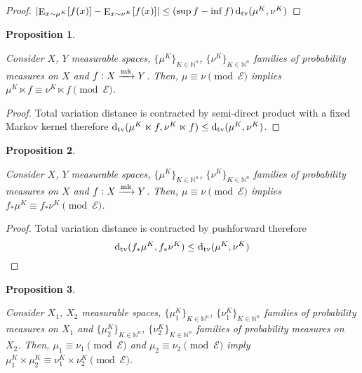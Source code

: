 \documentclass{article}
\numberwithin{equation}{section}
\theoremstyle{definition}
\theoremstyle{plain}
\newtheorem{proposition}{Proposition}[section]
\DeclareMathOperator{\E}{E}
\newcommand{\Dtv}{\operatorname{d}_{\textnormal{tv}}}
\newcommand{\Nats}{\mathbb{N}}
\newcommand{\Abs}[1]{\lvert #1 \rvert}
\newcommand{\Fall}{\mathcal{E}}
\newcommand{\Markov}{\xrightarrow{\textnormal{mk}}}
\begin{document}
\begin{proof}

$\Abs{\E_{x \sim \mu^K}[f(x)] - \E_{x \sim \nu^K}[f(x)]} \leq  (\sup f - \inf f)\Dtv(\mu^K, \nu^K)$
\end{proof}

\begin{samepage}
\begin{proposition}
\label{prp:prob_cong_semidir}

Consider $X$, $Y$ measurable spaces, $\{\mu^K\}_{K \in \Nats^n}$, $\{\nu^K\}_{K \in \Nats^n}$ families of probability measures on $X$ and $f: X \Markov Y$. Then, $\mu \equiv \nu \pmod \Fall$ implies $\mu^K \ltimes f \equiv \nu^K \ltimes f \pmod \Fall$.

\end{proposition}
\end{samepage}

\begin{proof}

Total variation distance is contracted by semi-direct product with a fixed Markov kernel therefore $\Dtv(\mu^K \ltimes f, \nu^K \ltimes f) \leq \Dtv(\mu^K, \nu^K)$.
\end{proof}

\begin{samepage}
\begin{proposition}
\label{prp:prob_cong_push}

Consider $X$, $Y$ measurable spaces, $\{\mu^K\}_{K \in \Nats^n}$, $\{\nu^K\}_{K \in \Nats^n}$ families of probability measures on $X$ and $f: X \Markov Y$. Then, $\mu \equiv \nu \pmod \Fall$ implies $f_*\mu^K \equiv f_*\nu^K \pmod \Fall$.

\end{proposition}
\end{samepage}

\begin{proof}

Total variation distance is contracted by pushforward therefore \[\Dtv(f_*\mu^K, f_*\nu^K) \leq \Dtv(\mu^K, \nu^K)\]
\end{proof}

\begin{samepage}
\begin{proposition}
\label{prp:prob_cong_dir}

Consider $X_1$, $X_2$ measurable spaces, $\{\mu_1^K\}_{K \in \Nats^n}$, $\{\nu_1^K\}_{K \in \Nats^n}$ families of probability measures on $X_1$ and $\{\mu_2^K\}_{K \in \Nats^n}$, $\{\nu_2^K\}_{K \in \Nats^n}$ families of probability measures on $X_2$. Then, $\mu_1 \equiv \nu_1 \pmod \Fall$ and $\mu_2 \equiv \nu_2 \pmod \Fall$ imply $\mu_1^K \times \mu_2^K \equiv \nu_1^K \times \nu_2^K \pmod \Fall$. 

\end{proposition}
\end{samepage}
\end{document}
